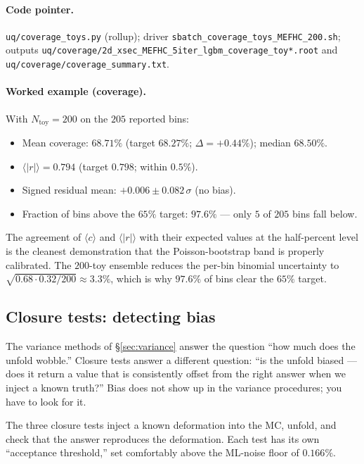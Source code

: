 \paragraph{Code pointer.}
\begin{sloppypar}
\texttt{uq/coverage\_toys.py} (rollup); driver
\texttt{sbatch\_coverage\_toys\_MEFHC\_200.sh}; outputs
\texttt{uq/coverage/2d\_xsec\_MEFHC\_5iter\_lgbm\_coverage\_toy*.root}
and \texttt{uq/coverage/coverage\_summary.txt}.
\end{sloppypar}

\paragraph{Worked example (coverage).}
With $N_{\text{toy}}=200$ on the $205$ reported bins:
\begin{itemize}[nosep]
  \item Mean coverage: $\boxed{68.71\%}$ (target $68.27\%$;
        $\Delta = +0.44\%$); median $68.50\%$.
  \item $\langle |r| \rangle = 0.794$ (target $0.798$; within $0.5\%$).
  \item Signed residual mean: $+0.006 \pm 0.082\,\sigma$ (no bias).
  \item Fraction of bins above the $65\%$ target: $\boxed{97.6\%}$ ---
        only $5$ of $205$ bins fall below.
\end{itemize}
The agreement of $\langle c \rangle$ and $\langle |r| \rangle$ with
their expected values at the half-percent level is the cleanest
demonstration that the Poisson-bootstrap band is properly calibrated.
The $200$-toy ensemble reduces the per-bin
binomial uncertainty to $\sqrt{0.68\cdot0.32/200}\approx 3.3\%$, which
is why $97.6\%$ of bins clear the $65\%$ target.

\subsection{Closure tests: detecting bias}
\label{sec:closure}

The variance methods of \S\ref{sec:variance} answer the question
``how much does the unfold wobble.'' Closure tests answer a
different question: ``is the unfold biased --- does it return a value
that is consistently offset from the right answer when we inject a
known truth?'' Bias does not show up in the variance procedures; you
have to look for it.

The three closure tests inject a known deformation into the MC,
unfold, and check that the answer reproduces the deformation. Each
test has its own ``acceptance threshold,'' set comfortably above the
ML-noise floor of $0.166\%$.

